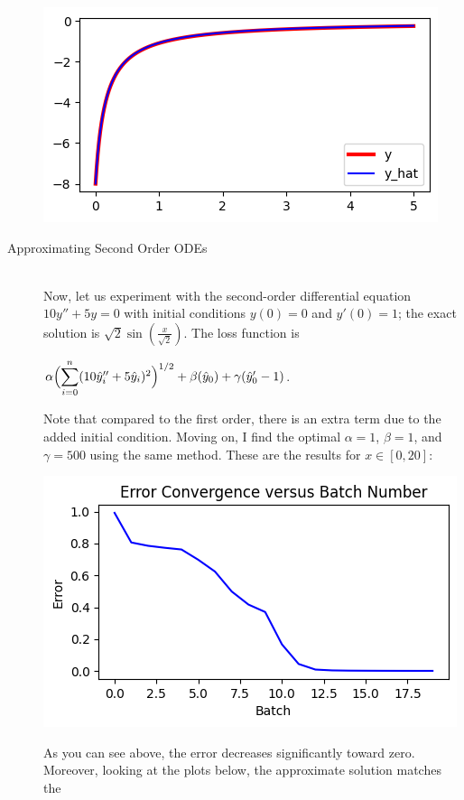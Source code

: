 \documentclass[12pt]{article}
\newcommand{\dsum}[2]{\mathlarger{\sum}_{#1}^{#2}}
\newcommand{\bgc}{\begin{center}}
\newcommand{\enc}{\end{center}}
\begin{document}
\begin{description}
\begin{minipage}{\linewidth}
        \includegraphics[scale=.5]{images/figure8.png}
    \end{minipage}

    \item[Approximating Second Order ODEs] \hfill \\
    Now, let us experiment with the second-order differential equation $10y''+
    5y = 0$ with initial conditions  $y(0) = 0$ and $y'(0) = 1$; the exact
    solution is $\sqrt{2}\sin(\frac{x}{\sqrt{2}})$. The loss function is 
    \bgc 
    $\alpha\Bigl(\dsum{i=0}{n}(10\hat{y}_i'' + 5\hat{y}_i)^2\Bigr)^{1/2} 
    + \beta(\hat{y}_0)
    + \gamma(\hat{y}_0' - 1)$.
    \enc
    Note that compared to the first order, there is an extra term due to the
    added initial condition. Moving on, I find the optimal $\alpha = 1$, $\beta
    = 1$, and $\gamma = 500$ using the same method. These are the results
    for $x\in[0, 20]$: \\
    \begin{minipage}{\linewidth}
        \centering
        \includegraphics[scale=.5]{images/figure9.png}
    \end{minipage}
    As you can see above, the error decreases significantly toward zero.
    Moreover, looking at the plots below, the approximate solution matches the

\end{description}
\end{document}
